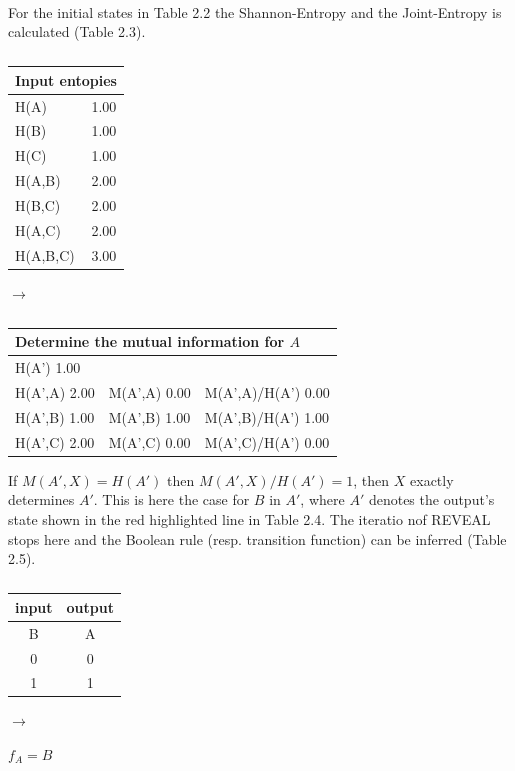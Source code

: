 \\
For the initial states in Table 2.2 the Shannon-Entropy and the Joint-Entropy is calculated (Table 2.3). 

\begin{table}[hbt!]
\parbox{.30\linewidth}{
\centering
\begin{tabular}{lc}
\multicolumn{2}{l}{\textbf{Input entopies}}\\
\hline
H(A) & 1.00 \\
H(B) & 1.00 \\
H(C) & 1.00 \\
H(A,B) & 2.00 \\
H(B,C) & 2.00 \\
H(A,C) & 2.00 \\
H(A,B,C) & 3.00
\end{tabular}
\caption{}
}
\hfill
$\rightarrow$
\hfill
\parbox{.65\linewidth}{
\centering
\begin{tabular}{|l|l|l|l|l|l|}
\multicolumn{6}{|l|}{\textbf{Determine the mutual information for $A$}} \\\hline
\multicolumn{6}{|l|}{H(A')  1.00} \\ \hline 
\multicolumn{2}{|l|}{H(A',A)  2.00} & \multicolumn{2}{l|}{M(A',A)  0.00} & \multicolumn{2}{l|}{M(A',A)/H(A')  0.00} \\ \hline
\multicolumn{2}{|l|}{H(A',B)  1.00} & \multicolumn{2}{l|}{M(A',B)  1.00} & \multicolumn{2}{l|}{\color{red}M(A',B)/H(A')  1.00} \\ \hline
\multicolumn{2}{|l|}{H(A',C)  2.00} & \multicolumn{2}{l|}{M(A',C)  0.00} & \multicolumn{2}{l|}{M(A',C)/H(A')  0.00}\\ \hline
\end{tabular}
\caption{}
}
\end{table}

If $M(A',X)=H(A')$ then $M(A',X)/H(A')=1$, then $X$ exactly determines $A'$. This is here the case for $B$ in $A'$, where $A'$ denotes the output's state shown in the red highlighted line in Table 2.4. The iteratio nof REVEAL stops here and the Boolean rule (resp. transition function) can be inferred (Table 2.5). \\

\begin{table}[hbt!]
\parbox{.30\linewidth}{
\centering
\begin{tabular}{c|c}
input & output \\ 
\hline
B & A \\ 
\hline
0 & 0 \\
1 & 1 \\
\end{tabular}
\caption{}}
\hfill
$\rightarrow$
\hfill
\parbox{.30\linewidth}{
\centering
$f_{A}= B$}
\end{table}

